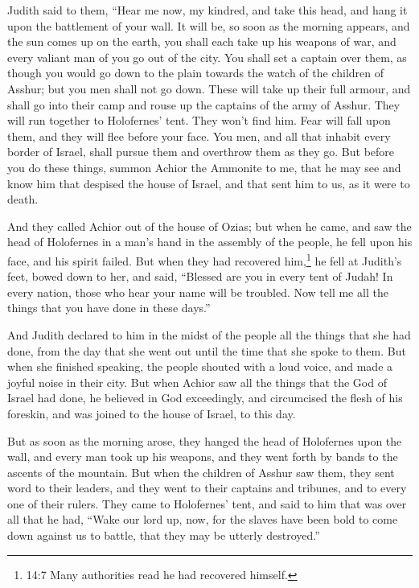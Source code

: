 Judith said to them, ``Hear me now, my kindred, and take
this head, and hang it upon the battlement of your wall.  It
will be, so soon as the morning appears, and the sun comes up on the
earth, you shall each take up his weapons of war, and every valiant man
of you go out of the city. You shall set a captain over them, as though
you would go down to the plain towards the watch of the children of
Asshur; but you men shall not go down.  These will take up
their full armour, and shall go into their camp and rouse up the
captains of the army of Asshur. They will run together to Holofernes'
tent. They won't find him. Fear will fall upon them, and they will flee
before your face.  You men, and all that inhabit every
border of Israel, shall pursue them and overthrow them as they go.
 But before you do these things, summon Achior the Ammonite
to me, that he may see and know him that despised the house of Israel,
and that sent him to us, as it were to death.

 And they called Achior out of the house of Ozias; but when
he came, and saw the head of Holofernes in a man's hand in the assembly
of the people, he fell upon his face, and his spirit failed.
 But when they had recovered him,\footnote{14:7 Many
  authorities read he had recovered himself.} he fell at Judith's feet,
bowed down to her, and said, ``Blessed are you in every tent of Judah!
In every nation, those who hear your name will be troubled. 
Now tell me all the things that you have done in these days.''

And Judith declared to him in the midst of the people all the things
that she had done, from the day that she went out until the time that
she spoke to them.  But when she finished speaking, the
people shouted with a loud voice, and made a joyful noise in their city.
 But when Achior saw all the things that the God of Israel
had done, he believed in God exceedingly, and circumcised the flesh of
his foreskin, and was joined to the house of Israel, to this day.

 But as soon as the morning arose, they hanged the head of
Holofernes upon the wall, and every man took up his weapons, and they
went forth by bands to the ascents of the mountain.  But
when the children of Asshur saw them, they sent word to their leaders,
and they went to their captains and tribunes, and to every one of their
rulers.  They came to Holofernes' tent, and said to him
that was over all that he had, ``Wake our lord up, now, for the slaves
have been bold to come down against us to battle, that they may be
utterly destroyed.''

